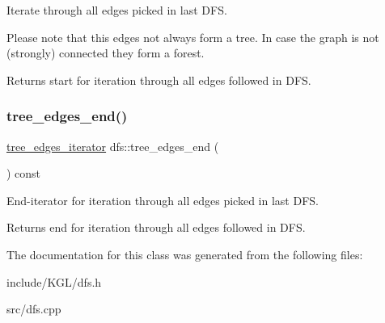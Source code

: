 Iterate through all edges picked in last D\+FS. 

Please note that this edges not always form a tree. In case the graph is not (strongly) connected they form a forest.

\begin{DoxyReturn}{Returns}
start for iteration through all edges followed in D\+FS. 
\end{DoxyReturn}
\mbox{\label{classdfs_ad1b9f759569cb52ba7ee415862c79831}} 
\subsubsection{\texorpdfstring{tree\+\_\+edges\+\_\+end()}{tree\_edges\_end()}}
{\footnotesize\ttfamily \mbox{\hyperlink{classdfs_a0eee0ddec5343c05f617d6d7aabb6d19}{tree\+\_\+edges\+\_\+iterator}} dfs\+::tree\+\_\+edges\+\_\+end (\begin{DoxyParamCaption}{ }\end{DoxyParamCaption}) const\hspace{0.3cm}{\ttfamily [inline]}}



End-\/iterator for iteration through all edges picked in last D\+FS. 

\begin{DoxyReturn}{Returns}
end for iteration through all edges followed in D\+FS. 
\end{DoxyReturn}


The documentation for this class was generated from the following files\+:\begin{DoxyCompactItemize}
\item 
include/\+K\+G\+L/dfs.\+h\item 
src/dfs.\+cpp\end{DoxyCompactItemize}
